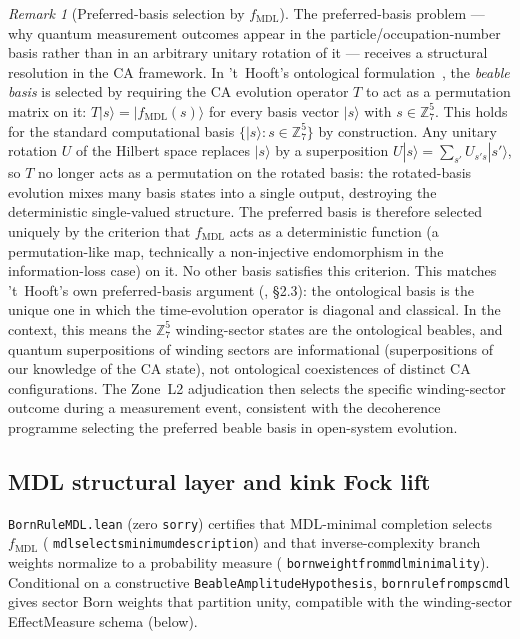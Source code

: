 \documentclass[11pt]{article}
\theoremstyle{remark}
\newtheorem{remark}[theorem]{Remark}
\newcommand{\GTE}{\text{GTE}}
\newcommand{\MDL}{\text{MDL}}
\newcommand{\lean}[1]{%
  \penalty-100
  \begingroup\def\_{\textunderscore\allowbreak}\texttt{#1}\endgroup}
\newcommand{\ket}[1]{|{#1}\rangle}
\begin{document}
\begin{remark}[Preferred-basis selection by $f_{\MDL}$]\label{rem:preferred_basis}
The preferred-basis problem --- why quantum measurement outcomes appear in the
particle/occupation-number basis rather than in an arbitrary unitary rotation of it
--- receives a structural resolution in the CA framework.
In 't~Hooft's ontological formulation~\cite{tHooft2016CA}, the \emph{beable basis}
is selected by requiring the CA evolution operator $T$ to act as a permutation matrix
on it: $T\ket{s} = \ket{f_{\MDL}(s)}$ for every basis vector $\ket{s}$ with $s \in
\mathbb{Z}_7^5$.
This holds for the standard computational basis $\{\ket{s} : s \in \mathbb{Z}_7^5\}$
by construction.
Any unitary rotation $U$ of the Hilbert space replaces $\ket{s}$ by a superposition
$U\ket{s} = \sum_{s'} U_{s's}\ket{s'}$, so $T$ no longer acts as a permutation on the
rotated basis: the rotated-basis evolution mixes many basis states into a single
output, destroying the deterministic single-valued structure.
The preferred basis is therefore selected uniquely by the criterion that $f_{\MDL}$
acts as a deterministic function (a permutation-like map, technically a non-injective
endomorphism in the information-loss case) on it.
No other basis satisfies this criterion.
This matches 't~Hooft's own preferred-basis argument (\cite{tHooft2016CA}, \S2.3):
the ontological basis is the unique one in which the time-evolution operator is
diagonal and classical.
In the \GTE{} context, this means the $\mathbb{Z}_7^5$ winding-sector states are the
ontological beables, and quantum superpositions of winding sectors are informational
(superpositions of our knowledge of the CA state), not ontological coexistences of
distinct CA configurations.
The Zone~L2 adjudication then selects the specific winding-sector outcome during a
measurement event, consistent with the decoherence programme selecting the preferred
beable basis in open-system evolution.
\end{remark}

\subsection{MDL structural layer and kink Fock lift}
\label{ssec:born_mdl}

\lean{BornRuleMDL.lean} (zero \texttt{sorry}) certifies that MDL-minimal completion
selects $f_{\MDL}$ (\lean{mdl\_selects\_minimum\_description}) and that
inverse-complexity branch weights normalize to a probability measure
(\lean{born\_weight\_from\_mdl\_minimality}).
Conditional on a constructive \lean{BeableAmplitudeHypothesis},
\lean{born\_rule\_from\_psc\_mdl} gives sector Born weights that partition unity,
compatible with the winding-sector EffectMeasure schema (below).
\end{document}
